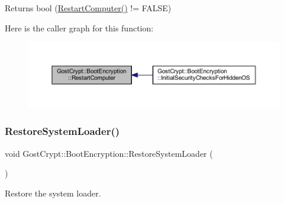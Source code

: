 \begin{DoxyReturn}{Returns}
bool (\hyperlink{_dlgcode_8c_ae5c680b07c23fe011659cb10ffed703c}{Restart\+Computer()} != F\+A\+L\+SE) 
\end{DoxyReturn}
Here is the caller graph for this function\+:
\nopagebreak
\begin{figure}[H]
\begin{center}
\leavevmode
\includegraphics[width=350pt]{class_gost_crypt_1_1_boot_encryption_aa8a362642702d24c487f62cd4a109300_icgraph}
\end{center}
\end{figure}
\mbox{\label{class_gost_crypt_1_1_boot_encryption_aadfca881f52d27e0f6bf271702194da3}} 
\subsubsection{\texorpdfstring{Restore\+System\+Loader()}{RestoreSystemLoader()}}
{\footnotesize\ttfamily void Gost\+Crypt\+::\+Boot\+Encryption\+::\+Restore\+System\+Loader (\begin{DoxyParamCaption}{ }\end{DoxyParamCaption})\hspace{0.3cm}{\ttfamily [protected]}}



Restore the system loader. 

